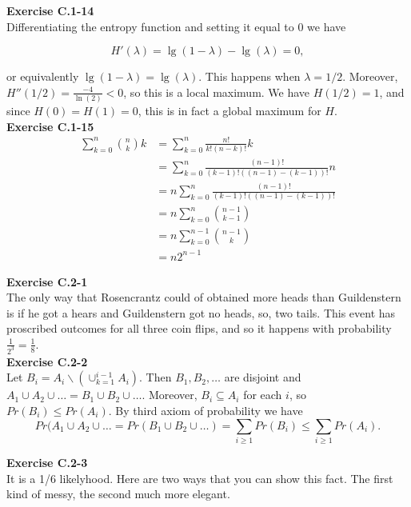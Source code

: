 \documentclass{article}
\begin{document}
\noindent\textbf{Exercise C.1-14}\\

Differentiating the entropy function and setting it equal to 0 we have 

\[ H'(\lambda) = \lg(1-\lambda) - \lg(\lambda) = 0,\]

or equivalently $\lg(1-\lambda) = \lg(\lambda)$.  This happens when $\lambda = 1/2$.  Moreover, $H''(1/2) = \frac{-4}{\ln(2)} < 0$, so this is a local maximum.  We have $H(1/2) = 1$, and since $H(0) = H(1) = 0$, this is in fact a global maximum for $H$. \\

\noindent\textbf{Exercise C.1-15}\\

\begin{align*}
\sum_{k=0}^n \binom{n}{k}k &= \sum_{k=0}^n \frac{n!}{k!(n-k)!}k\\
&=\sum_{k=0}^n \frac{(n-1)!}{(k-1)!((n-1)-(k-1))!} n\\
&= n \sum_{k=0}^{n}\frac{(n-1)!}{(k-1)!((n-1)-(k-1))!}\\
&=n \sum_{k=0}^n \binom{n-1}{k-1}\\
&=n \sum_{k=0}^{n-1} \binom{n-1}{k}\\
&=n2^{n-1}
\end{align*}

\noindent\textbf{Exercise C.2-1}\\

The only way that Rosencrantz could of obtained more heads than Guildenstern is if he got a hears and Guildenstern got no heads, so, two tails. This event has proscribed outcomes for all three coin flips, and so it happens with probability $\frac{1}{2^3} = \frac{1}{8}$.\\


\noindent\textbf{Exercise C.2-2}\\

Let $B_i = A_i \backslash (\cup_{k=1}^{i-1}A_i)$.  Then $B_1, B_2, \ldots $ are disjoint and $A_1 \cup A_2 \cup \ldots = B_1 \cup B_2 \cup \ldots$.  Moreover, $B_i \subseteq A_i$ for each $i$, so $Pr(B_i) \leq Pr(A_i)$.  By third axiom of probability we have 
\[ Pr(A_1 \cup A_2 \cup \ldots = Pr(B_1 \cup B_2 \cup \ldots) = \sum_{i \geq 1} Pr(B_i) \leq \sum_{i \geq 1} Pr(A_i).\]

\noindent\textbf{Exercise C.2-3}\\

It is a 1/6 likelyhood. Here are two ways that you can show this fact. The first kind of messy, the second much more elegant.
\end{document}
